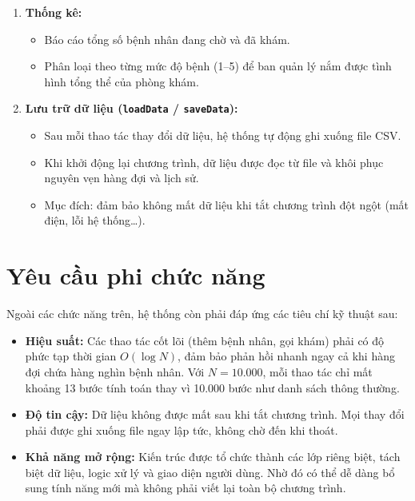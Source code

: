 \documentclass[12pt,a4paper]{report}
\begin{document}
\begin{enumerate}
  \item \textbf{Thống kê:}
        \begin{itemize}
          \item Báo cáo tổng số bệnh nhân đang chờ và đã khám.
          \item Phân loại theo từng mức độ bệnh (1--5) để ban quản lý nắm
                được tình hình tổng thể của phòng khám.
        \end{itemize}

  \item \textbf{Lưu trữ dữ liệu (\texttt{loadData} / \texttt{saveData}):}
        \begin{itemize}
          \item Sau mỗi thao tác thay đổi dữ liệu, hệ thống tự động ghi
                xuống file CSV.
          \item Khi khởi động lại chương trình, dữ liệu được đọc từ file và
                khôi phục nguyên vẹn hàng đợi và lịch sử.
          \item Mục đích: đảm bảo không mất dữ liệu khi tắt chương trình
                đột ngột (mất điện, lỗi hệ thống\ldots).
        \end{itemize}
\end{enumerate}

\section{Yêu cầu phi chức năng}

Ngoài các chức năng trên, hệ thống còn phải đáp ứng các tiêu chí kỹ thuật sau:

\begin{itemize}
  \item \textbf{Hiệu suất:} Các thao tác cốt lõi (thêm bệnh nhân, gọi khám)
        phải có độ phức tạp thời gian $O(\log N)$, đảm bảo phản hồi nhanh ngay
        cả khi hàng đợi chứa hàng nghìn bệnh nhân. Với $N = 10.000$, mỗi thao
        tác chỉ mất khoảng 13 bước tính toán thay vì 10.000 bước như danh sách
        thông thường.
  \item \textbf{Độ tin cậy:} Dữ liệu không được mất sau khi tắt chương trình.
        Mọi thay đổi phải được ghi xuống file ngay lập tức, không chờ đến khi
        thoát.
  \item \textbf{Khả năng mở rộng:} Kiến trúc được tổ chức thành các lớp riêng
        biệt, tách biệt dữ liệu, logic xử lý và giao diện người dùng. Nhờ đó có
        thể dễ dàng bổ sung tính năng mới mà không phải viết lại toàn bộ chương
        trình.
\end{itemize}
\end{document}
